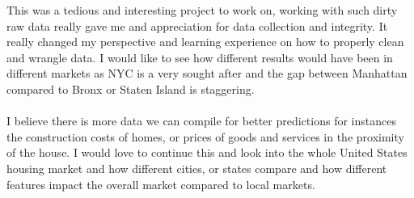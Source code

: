 \documentclass{article}
\begin{document}
\begin{titlepage}
This was a tedious and interesting project to work on, working with such dirty raw data really gave me and appreciation for data collection and integrity. It really changed my perspective and learning experience on how to properly clean and wrangle data. I would like to see how different results would have been in different markets as NYC is a very sought after and the gap between Manhattan compared to Bronx or Staten Island is staggering.
\\
\\
I believe there is more data we can compile for better predictions for instances the construction costs of homes, or prices of goods and services in the proximity of the house. I would love to continue this and look into the whole United States housing market and how different cities, or states compare and how different features impact the overall market compared to local markets.


\end{titlepage}
\end{document}
